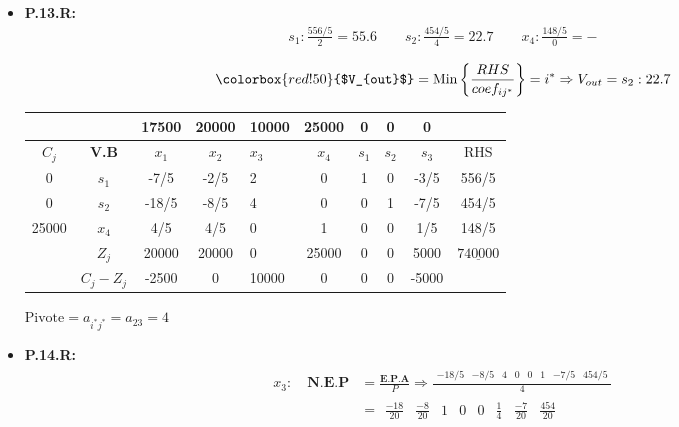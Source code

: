 \documentclass{templateNote}
\begin{document}
\begin{itemize}
    \item \textbf{P.13.R:}
    \begin{align*}
        s_1: \frac{556/5}{2} = 55.6 \qquad s_2: \frac{454/5}{4} = 22.7 \qquad x_4: \frac{148/5}{0} = - \\
    \end{align*}
    \begin{equation*}
        \colorbox{red!50}{$V_{out}$} = \text{Min} \left\{ \frac{RHS}{coef_{ij^*}} \right\} = i^* \Rightarrow V_{out} = s_2 : 22.7
    \end{equation*}

    \begin{center}
        \begin{tabular}{|c|c|c|c|g|c|c|c|c|c|}
            \hline
            & & 17500 & 20000 & 10000 & 25000 & 0 & 0 & 0 & \\ \hline
            $C_j$ & \textbf{V.B} & $x_1$ & $x_2$ & $x_3$ & $x_4$ & $s_1$ & $s_2$ & $s_3$ & RHS \\  & $s_1$ & -7/5 & -2/5 & 2 & 0 & 1 & 0 & -3/5 & 556/5 \\
            0 & $s_2$ & -18/5 & -8/5 & 4 & 0 & 0 & 1 & -7/5 & 454/5 \\
            25000 & $x_4$ & 4/5 & 4/5 & 0 & 1 & 0 & 0 & 1/5 & 148/5 \\ \hline
            & $Z_j$ & 20000 & 20000 & 0 & 25000 & 0 & 0 & 5000 & $\underline{740000}$ \\ \hline
            & $C_j - Z_j$ & -2500 & 0 & 10000 & 0 & 0 & 0 & -5000 & \\ \hline
        \end{tabular}
    \end{center}
    \begin{center}
        $\text{Pivote} = a_{i^*j^*} = a_{23} = 4$
    \end{center}

    \item \textbf{P.14.R:}
    \begin{align*}
        x_3: \quad \textbf{N.E.P} &= \frac{\textbf{E.P.A}}{P} \Rightarrow \frac{\begin{array}{cccccccc} -18/5 & -8/5 & 4 & 0 & 0 & 1 & -7/5 & 454/5\end{array}}{4} \\ &= \begin{array}{cccccccc} \frac{-18}{20} & \frac{-8}{20} & 1 & 0 & 0 & \frac{1}{4} & \frac{-7}{20} & \frac{454}{20}\end{array}
    \end{align*}


\end{itemize}
\end{document}
